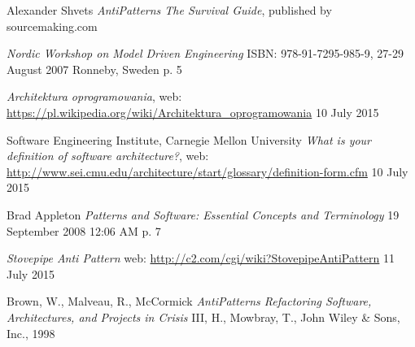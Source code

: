 \begin{thebibliography}{9}
     
    Alexander Shvets
    \emph{AntiPatterns The Survival Guide},
    published by sourcemaking.com
    
    
    \emph{Nordic Workshop on Model Driven Engineering}
    ISBN: 978-91-7295-985-9,
    27-29 August 2007 Ronneby, Sweden
    p. 5
    
    \emph{Architektura oprogramowania},
    web: \url{https://pl.wikipedia.org/wiki/Architektura_oprogramowania}
    10 July 2015
    
    Software Engineering Institute, Carnegie Mellon University
    \emph{What is your definition of software architecture?},
    web: \url{http://www.sei.cmu.edu/architecture/start/glossary/definition-form.cfm}
    10 July 2015
    
     Brad Appleton
     \emph{Patterns and Software: Essential Concepts and Terminology}
     19 September 2008 12:06 AM
     p. 7
     
    \emph{Stovepipe Anti Pattern}
    web: \url{http://c2.com/cgi/wiki?StovepipeAntiPattern}
    11 July 2015
    
    Brown, W., Malveau, R., McCormick
    \emph{AntiPatterns Refactoring Software, Architectures, and Projects in Crisis}
    III, H., Mowbray, T., John Wiley \& Sons, Inc., 1998
    

\end{thebibliography}